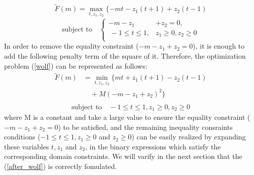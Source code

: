 \documentclass[fp,twocolumn]{jpsj3}
\begin{document}
\begin{eqnarray}
  \widetilde{F}(m)=\max_{t,z_{1},z_{2}}{\{-mt-z_{1}(t+1)+z_{2}(t-1)} \label{wolf}
\end{eqnarray}
\begin{equation}
  \text{subject to} \quad \left\{
  \begin{aligned}
   -m-z_{1}&+z_{2}=0, \nonumber \\
   \ -1\leq t\leq 1,& z_{1}\geq 0, z_{2}\geq 0 \nonumber \\
  \end{aligned}
  \right.
\end{equation}
In order to remove the equality constraint ($-m-z_{1}+z_{2}=0$), it is enough to add the following penalty term of the square of it. Therefore, the optimization problem (\ref{wolf}) can be represented as follows:
\begin{equation}
  \begin{aligned}
    \widetilde{F}(m)&=\min_{t,z_{1},z_{2}}{\{mt+z_{1}(t+1)-z_{2}(t-1)} \\
    &\quad+M(-m-z_{1}+z_{2})^{2}\} \label{after_wolf} \\
  \end{aligned}
\end{equation}
\begin{eqnarray}
  \text{subject to} \quad -1\leq t\leq 1, z_{1}\geq 0, z_{2}\geq 0 \nonumber
\end{eqnarray}
where M is a constant and take a large value to ensure the equality constraint ($-m-z_{1}+z_{2}=0$) to be satisfied, and the remaining inequality consraints conditions ($-1\leq t\leq 1, z_{1}\geq 0$ and $z_{2}\geq 0$) can be easily realized by expanding these variables $t,z_{1}$ and $z_{2}$, in the binary expressions which satisfy the corresponding domain constraints. We will varify in the next section that the (\ref{after_wolf}) is correctly fomulated. 
\end{document}
